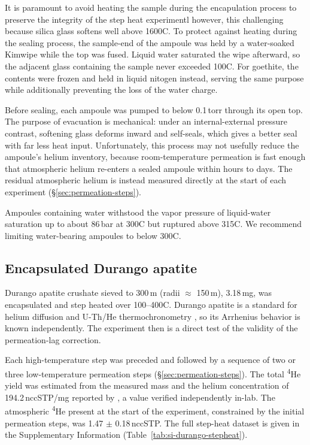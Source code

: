 It is paramount to avoid heating the sample during the encapulation process to preserve the integrity of the step heat experimentl however, this challenging because silica glass softens well above 1600\textdegree C. To protect against heating during the sealing process, the sample-end of the ampoule was held by a water-soaked Kimwipe while the top was fused. Liquid water saturated the wipe afterward, so the adjacent glass containing the sample never exceeded 100\textdegree C. For goethite, the contents were frozen and held in liquid nitogen instead, serving the same purpose while additionally preventing the loss of the water charge.

Before sealing, each ampoule was pumped to below 0.1\,torr through its open top. The purpose of evacuation is mechanical: under an internal-external pressure contrast, softening glass deforms inward and self-seals, which gives a better seal with far less heat input. Unfortunately, this process may not usefully reduce the ampoule's helium inventory, because room-temperature permeation is fast enough that atmospheric helium re-enters a sealed ampoule within hours to days. The residual atmospheric helium is instead measured directly at the start of each experiment (\S\ref{sec:permeation-steps}).

Ampoules containing water withstood the vapor pressure of liquid-water saturation up to about 86\,bar at 300\textdegree C \citep{haar1984} but ruptured above 315\textdegree C. We recommend limiting water-bearing ampoules to below 300\textdegree C.

\subsection{Encapsulated Durango apatite}\label{sec:methods-apatite}

Durango apatite crushate sieved to 300\,\textmu m (radii $\approx$ 150\,\textmu m), 3.18\,mg, was encapsulated and step heated over 100--400\textdegree C. Durango apatite is a standard for helium diffusion and U-Th/He thermochronometry \citep{zeitler1987,wolf1996,farley2000,shuster2005,shuster2006,flowers2007}, so its Arrhenius behavior is known independently. The experiment then is a direct test of the validity of the permeation-lag correction.

Each high-temperature step was preceded and followed by a sequence of two or three low-temperature permeation steps (\S\ref{sec:permeation-steps}). The total \textsuperscript{4}He yield was estimated from the measured mass and the helium concentration of 194.2\,nccSTP/mg reported by \citet{farley2000}, a value verified independently in-lab. The atmospheric \textsuperscript{4}He present at the start of the experiment, constrained by the initial permeation steps, was 1.47 $\pm$ 0.18\,nccSTP. The full step-heat dataset is given in the Supplementary Information (Table~\ref{tab:si-durango-stepheat}).

